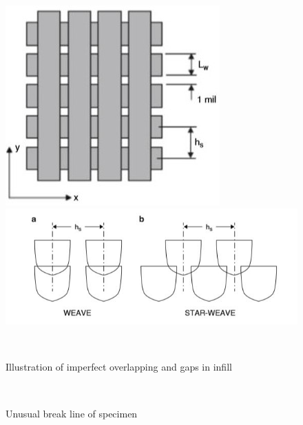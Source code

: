 \documentclass[a4paper, twoside, 11pt]{report}
\begin{document}
\begin{figure}[!t]
 \begin{minipage}[b]{0.45\textwidth}
    \includegraphics[width=\textwidth]{weave1}
  \end{minipage}
  \hfill
  \begin{minipage}[b]{0.45\textwidth}
    \includegraphics[width=\textwidth]{weave2}
  \end{minipage}
  \\[1pt]
  \begin{minipage}[t]{0.45\textwidth}
    \caption{Illustration of imperfect overlapping and gaps in infill}
  \end{minipage}
  \hfill
  \begin{minipage}[t]{0.45\textwidth}
    \caption{Unusual break line of specimen}
  \end{minipage}
  \\[5pt]
   \begin{minipage}[b]{0.45\textwidth}

\end{minipage}
\end{figure}
\end{document}
